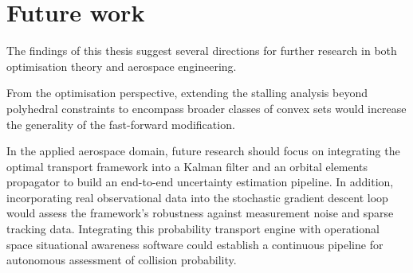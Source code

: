 \section{Future work} \label{sec:future_work}

The findings of this thesis suggest several directions for further research in both optimisation theory and aerospace engineering.

From the optimisation perspective, extending the stalling analysis beyond polyhedral constraints to encompass broader classes of convex sets would increase the generality of the fast-forward modification.

In the applied aerospace domain, future research should focus on integrating the optimal transport framework into a Kalman filter and an orbital elements propagator to build an end-to-end uncertainty estimation pipeline. In addition, incorporating real observational data into the stochastic gradient descent loop would assess the framework's robustness against measurement noise and sparse tracking data. Integrating this probability transport engine with operational space situational awareness software could establish a continuous pipeline for autonomous assessment of collision probability.